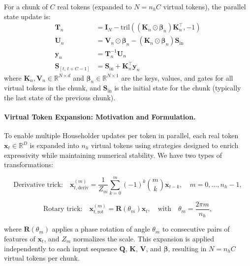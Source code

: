 \documentclass[10pt,a4paper]{article}
\begin{document}
For a chunk of $C$ real tokens (expanded to $N = n_h C$ virtual tokens), the parallel state update is:
\begin{align}
    \mathbf{T}_n &= \mathbf{I}_N - \mathrm{tril}\left((\mathbf{K}_n \odot \boldsymbol{\beta}_n) \mathbf{K}_n^\top, -1\right) \label{eq:triangular-nh} \\
    \mathbf{U}_n &= \mathbf{V}_n \odot \boldsymbol{\beta}_n - (\mathbf{K}_n \odot \boldsymbol{\beta}_n) \mathbf{S}_{\mathrm{in}} \\
    \mathbf{y}_n &= \mathbf{T}_n^{-1} \mathbf{U}_n \\
    \mathbf{S}_{[t,\,t+C-1]} &= \mathbf{S}_{\mathrm{in}} + \mathbf{K}_n^\top \mathbf{y}_n
    \label{eq:chunk-deltaproduct}
\end{align}
where $\mathbf{K}_n, \mathbf{V}_n \in \mathbb{R}^{N \times d}$ and $\boldsymbol{\beta}_n \in \mathbb{R}^{N \times 1}$ are the keys, values, and gates for all virtual tokens in the chunk, and $\mathbf{S}_{\mathrm{in}}$ is the initial state for the chunk (typically the last state of the previous chunk).


\paragraph{Virtual Token Expansion: Motivation and Formulation.}

To enable multiple Householder updates per token in parallel, each real token $\mathbf{x}_t \in \mathbb{R}^D$ is expanded into $n_h$ virtual tokens using strategies designed to enrich expressivity while maintaining numerical stability. We have two types of transformations:

\begin{equation}
    \text{Derivative trick:} \quad \mathbf{x}_{t,\mathrm{deriv}}^{(m)} = \frac{1}{Z_m} \sum_{k=0}^m (-1)^k \binom{m}{k} \mathbf{x}_{t-k}, \quad m=0,\ldots,n_h - 1,
    \label{eq:derivative-trick}
\end{equation}

\begin{equation}
    \text{Rotary trick:} \quad \mathbf{x}_{t,\mathrm{rot}}^{(m)} = \mathbf{R}(\theta_m) \mathbf{x}_t, \quad \text{with} \quad \theta_m = \frac{2\pi m}{n_h},
    \label{eq:rotative-trick}
\end{equation}

where $\mathbf{R}(\theta_m)$ applies a phase rotation of angle $\theta_m$ to consecutive pairs of features of $\mathbf{x}_t$, and $Z_m$ normalizes the scale. This expansion is applied independently to each input sequence $\mathbf{Q}$, $\mathbf{K}$, $\mathbf{V}$, and $\boldsymbol{\beta}$, resulting in $N = n_h C$ virtual tokens per chunk.
\end{document}
